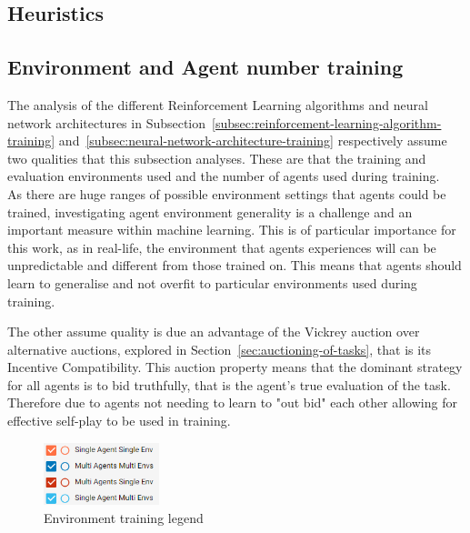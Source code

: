 
\subsection{Heuristics}\label{subsec:heuristics}


\subsection{Environment and Agent number training}\label{subsec:environment-and-agent-number-training}
The analysis of the different Reinforcement Learning algorithms and neural network architectures in
Subsection~\ref{subsec:reinforcement-learning-algorithm-training} and~\ref{subsec:neural-network-architecture-training}
respectively assume two qualities that this subsection analyses. These are that the training and evaluation environments
used and the number of agents used during training. \\
As there are huge ranges of possible environment settings that agents could be trained, investigating agent environment
generality is a challenge and an important measure within machine learning. This is of particular importance for this
work, as in real-life, the environment that agents experiences will can be unpredictable and different from those
trained on. This means that agents should learn to generalise and not overfit to particular environments used during
training.

The other assume quality is due an advantage of the Vickrey auction over alternative auctions, explored in
Section~\ref{sec:auctioning-of-tasks}, that is its Incentive Compatibility. This auction property means that the
dominant strategy for all agents is to bid truthfully, that is the agent's true evaluation of the task. Therefore due
to agents not needing to learn to "out bid" each other allowing for effective self-play to be used in training.

\begin{figure}
    \includegraphics[width=0.3\textwidth]{figures/5_evaluation_figs/env_training_fig/legend.png}
    \caption{Environment training legend}
    \label{fig:env-training-legend}
\end{figure}

